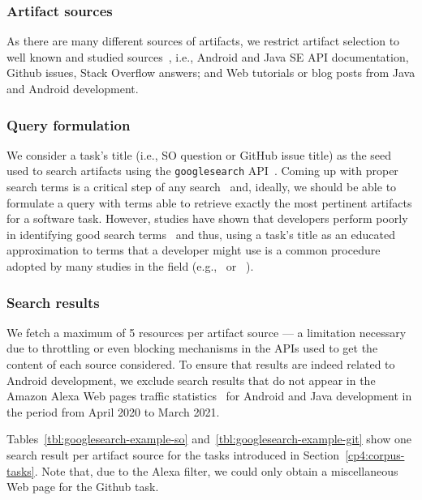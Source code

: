 \subsubsection{Artifact sources}

As there are many different sources of artifacts, we restrict artifact selection to well known and studied sources~\cite{Starke2009,Kevic2014, Li2013}, i.e.,
Android and Java SE API documentation, Github issues, Stack Overflow answers; and Web tutorials or blog posts from Java and Android development.



\subsubsection{Query formulation}



We consider a task's title (i.e., SO question or GitHub issue title) as the seed used to search artifacts
using the \texttt{googlesearch} API~\cite{googlesearch}.
Coming up with proper search terms is a critical step of any search~\cite{Haiduc2013}
and, ideally, we should be able to formulate a query with terms able to retrieve exactly the most pertinent artifacts for a software task.
However, studies have shown that developers perform poorly in identifying good search terms~\cite{Starke2009,Kevic2014, Li2013} and thus, using a task's title
as an educated approximation to terms that a developer might use is a common procedure adopted by many studies in the field (e.g.,~\cite{Xu2017} or ~\cite{Silva2019}).







\subsubsection{Search results}


We fetch a maximum of 5 resources per artifact source --- a limitation necessary due to throttling or even blocking mechanisms in the APIs used to get the content of each source considered. To ensure that results 
are indeed related to Android development, we exclude search results that do not appear in the Amazon Alexa Web pages traffic statistics~\cite{alexa}
for Android and Java development in the period from April 2020 to March 2021.


Tables~\ref{tbl:googlesearch-example-so} and~\ref{tbl:googlesearch-example-git} show one search result per artifact source for the tasks introduced in Section~\ref{cp4:corpus-tasks}.
Note that, due to the Alexa filter, we could only obtain a miscellaneous Web page for the Github task.


